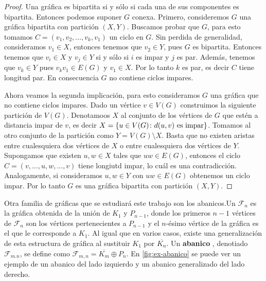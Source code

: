 \begin{proof}
    Una gr\'afica es bipartita si y s\'olo si cada una de sus componentes es
    bipartita. Entonces podemos suponer $G$ conexa. Primero, consideremos $G$
    una gr\'afica bipartita con partici\'on $(X,Y)$. Buscamos probar que $G$,
    para esto tomamos $C=(v_1,v_2,\dots, v_k,v_1)$ un ciclo en $G$. Sin perdida
    de generalidad, consideramos $v_1 \in X$, entonces tenemos que $v_2 \in Y$,
    pues $G$ es bipartita. Entonces tenemos que $v_i \in X$ y $v_j \in Y$ si y
    s\'olo si $i$ es impar y $j$ es par. Adem\'as, tenemos que $v_k \in Y$ pues
    $v_kv_1 \in E(G)$ y $v_1 \in X$. Por lo tanto $k$ es par, es decir $C$ tiene
    longitud par. En consecuencia $G$ no contiene ciclos impares.

    Ahora veamos la segunda implicaci\'on, para esto consideramos $G$ una
    gr\'afica que no contiene ciclos impares. Dado un v\'ertice $v \in V(G)$
    construimos la siguiente partici\'on de $V(G)$. Denotamoos $X$ al conjunto
    de los v\'ertices de $G$ que est\'en a distancia impar de $v$, es decir $X =
    \{u \in V(G) \colon d(u,v) \textnormal{ es impar}\}$. Tomamos al otro
    conjunto de la partici\'on como $Y = V(G)\setminus X$. Basta que no existen
    aristas entre cualesquiera dos v\'ertices de $X$ o entre cualesquiera dos
    v\'ertices de $Y$. Supongamos que existen $u,w \in X$ tales que $uw \in
    E(G)$, entonces el ciclo $C=(v, \dots,u,w,\dots,v)$ tiene longiutd impar, lo
    cu\'al es una contradicci\'on. Analogamente, si consideramos $u,w \in Y$ con
    $uw \in E(G)$ obtenemos un ciclo impar. Por lo tanto $G$ es una gr\'afica
    bipartita con partici\'on $(X,Y)$.
\end{proof}
    
Otra  familia de gr\'aficas que se estudiar\'a este trabajo son los abanicos.Un
 $\mathcal{F}_n$ es la gr\'afica obtenida de la uni\'on de $K_1$
y $P_{n-1}$, donde los primeros $n-1$ v\'ertices de $\mathcal{F}_n$ son los
v\'ertices pertenecientes a $P_{n-1}$ y el $n$-\'esimo v\'ertice de la gr\'afica
es el que le corresponde a $K_1$. 
Al igual que en varios casos, existe una generalizaci\'on de esta
estructura de gr\'afica al sustituir $K_1$ por $\overline{K_n}$. Un
\textbf{abanico} , denotiado
$\mathcal{F}_{m.n}$, se define como $\mathcal{F}_{m,n}=\overline{K_m} \oplus
P_n$. En \cref{fig:ex-abanico} se puede ver un ejemplo de un abanico del lado
izquierdo y un abanico generalizado del lado derecho.

